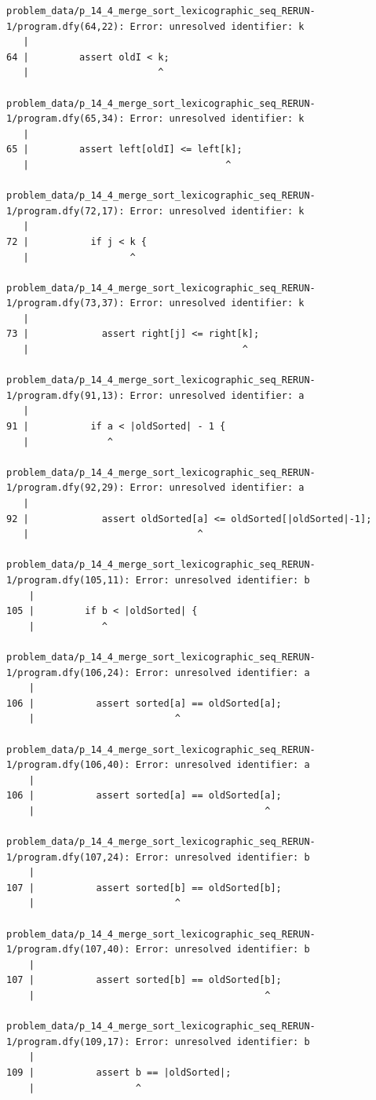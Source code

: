 \documentclass{article}
\begin{document}
\begin{lstlisting}
problem_data/p_14_4_merge_sort_lexicographic_seq_RERUN-1/program.dfy(64,22): Error: unresolved identifier: k
   |
64 |         assert oldI < k;
   |                       ^

problem_data/p_14_4_merge_sort_lexicographic_seq_RERUN-1/program.dfy(65,34): Error: unresolved identifier: k
   |
65 |         assert left[oldI] <= left[k];
   |                                   ^

problem_data/p_14_4_merge_sort_lexicographic_seq_RERUN-1/program.dfy(72,17): Error: unresolved identifier: k
   |
72 |           if j < k {
   |                  ^

problem_data/p_14_4_merge_sort_lexicographic_seq_RERUN-1/program.dfy(73,37): Error: unresolved identifier: k
   |
73 |             assert right[j] <= right[k];
   |                                      ^

problem_data/p_14_4_merge_sort_lexicographic_seq_RERUN-1/program.dfy(91,13): Error: unresolved identifier: a
   |
91 |           if a < |oldSorted| - 1 {
   |              ^

problem_data/p_14_4_merge_sort_lexicographic_seq_RERUN-1/program.dfy(92,29): Error: unresolved identifier: a
   |
92 |             assert oldSorted[a] <= oldSorted[|oldSorted|-1];
   |                              ^

problem_data/p_14_4_merge_sort_lexicographic_seq_RERUN-1/program.dfy(105,11): Error: unresolved identifier: b
    |
105 |         if b < |oldSorted| {
    |            ^

problem_data/p_14_4_merge_sort_lexicographic_seq_RERUN-1/program.dfy(106,24): Error: unresolved identifier: a
    |
106 |           assert sorted[a] == oldSorted[a];
    |                         ^

problem_data/p_14_4_merge_sort_lexicographic_seq_RERUN-1/program.dfy(106,40): Error: unresolved identifier: a
    |
106 |           assert sorted[a] == oldSorted[a];
    |                                         ^

problem_data/p_14_4_merge_sort_lexicographic_seq_RERUN-1/program.dfy(107,24): Error: unresolved identifier: b
    |
107 |           assert sorted[b] == oldSorted[b];
    |                         ^

problem_data/p_14_4_merge_sort_lexicographic_seq_RERUN-1/program.dfy(107,40): Error: unresolved identifier: b
    |
107 |           assert sorted[b] == oldSorted[b];
    |                                         ^

problem_data/p_14_4_merge_sort_lexicographic_seq_RERUN-1/program.dfy(109,17): Error: unresolved identifier: b
    |
109 |           assert b == |oldSorted|;
    |                  ^


\end{lstlisting}
\end{document}
